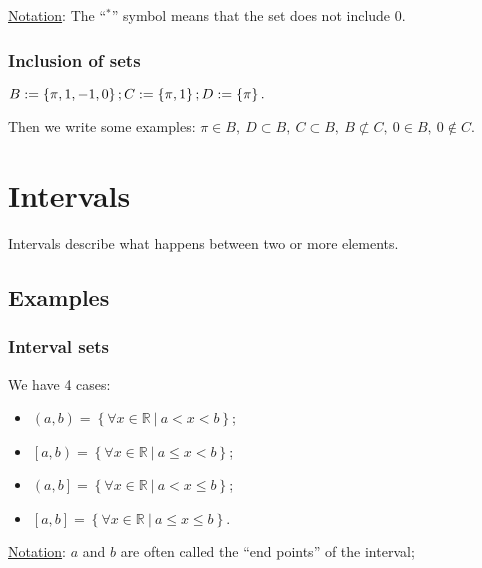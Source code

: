 \documentclass{article}
\newcommand{\figbox}[1]{ 
    \begin{figure*}[ht!]        
        \begin{center}            
            \fbox{#1}        
        \end{center}    
    \end{figure*}
}
\newcommand{\nots}{\underline{Notation}: }
\newcommand{\sht}{\ |\ }
\begin{document}
\nots{The ``$^*$'' symbol means that the set does not include 0.}

\subsubsection{Inclusion of sets}
\figbox{$\mathbb{N} \subset  \mathbb{Z} \subset \mathbb{Q} \subset \mathbb{R} \subset \mathbb{C}$}

$
    B := \left\{\pi, 1,-1,0\right\}; \\
    C := \left\{\pi, 1\right\}; \\
    D := \left\{\pi\right\}.
$

Then we write some examples: $\pi \in B,\ D \subset B,\ C \subset B,\ B \not\subset C,\ 0 \in B,\ 0 \notin C$.

\newpage
\section{Intervals}
Intervals describe what happens between two or more elements.

\subsection{Examples}
\subsubsection{Interval sets}
We have 4 cases:
\begin{itemize}
    \item $(a,b) = \left\{\forall x \in \mathbb{R} \sht a<x<b\right\}$;
    \item $\left[a,b\right) = \left\{\forall x \in \mathbb{R} \sht a\leq x<b\right\}$;
    \item $\left(a,b\right] = \left\{\forall x \in \mathbb{R} \sht a<x\leq b\right\}$;
    \item $\left[a,b\right] = \left\{\forall x \in \mathbb{R} \sht a\leq x\leq b\right\}$.
\end{itemize}

\nots{$a$ and $b$ are often called the ``end points'' of the interval;\\}
\end{document}
